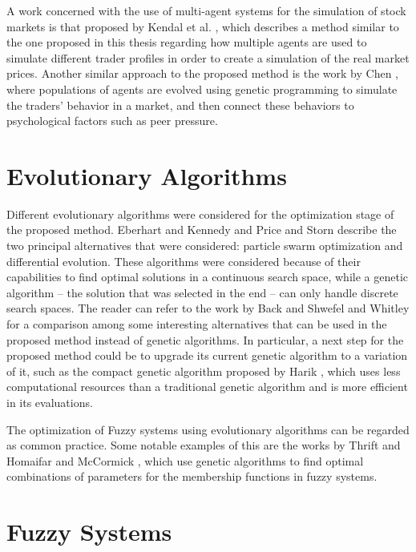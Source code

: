 A work concerned with the use of multi-agent systems for the simulation of stock
markets is that proposed by Kendal et al. \cite{Kendall2003}, which describes a method similar to the one
proposed in this thesis regarding how multiple agents are used to simulate
different trader profiles in order to create a simulation of the real market
prices. Another similar approach to the proposed method is the work by
Chen \cite{Chen2001}, where populations of agents are evolved using genetic
programming to simulate the traders' behavior in a market, and then connect
these behaviors to psychological factors such as peer pressure.

\section{Evolutionary Algorithms}
\label{section:evolutionary-algorithms}

Different evolutionary algorithms were considered for the optimization stage of
the proposed method. Eberhart and Kennedy \cite{Eberhart2002} and Price and
Storn \cite{Price1997} describe the two principal alternatives that were
considered: particle swarm optimization and differential evolution. These
algorithms were considered because of their capabilities to find optimal
solutions in a continuous search space, while a genetic algorithm -- the
solution that was selected in the end -- can only handle discrete search
spaces. The reader can refer to the work by Back and Shwefel \cite{Back2008} and
Whitley \cite{Whitley1994} for a comparison among some interesting alternatives
that can be used in the proposed method instead of genetic algorithms. In
particular, a next step for the proposed method could be to upgrade its current
genetic algorithm to a variation of it, such as the compact genetic algorithm
proposed by Harik \cite{Harik1999}, which uses less computational resources than
a traditional genetic algorithm and is more efficient in its evaluations.

The optimization of Fuzzy systems using evolutionary algorithms can be regarded as
common practice. Some notable examples of this are the works by Thrift
\cite{Thrift1991} and Homaifar and McCormick \cite{Homaifar1995}, which use
genetic algorithms to find optimal combinations of parameters for the membership
functions in fuzzy systems.

\section{Fuzzy Systems}
\label{section:fuzzy-systems}

